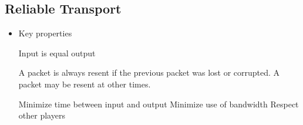 \subsection{Reliable Transport}
\begin{itemize}
    \item Key properties
        \begin{itemize}
             Input is equal output
                \begin{itemize}
                     A packet is always resent if the previous packet was lost or corrupted. A packet may be resent at other times.
                \end{itemize}
             Minimize time between input and output
             Minimize use of bandwidth
             Respect other players
        \end{itemize}
\end{itemize}

